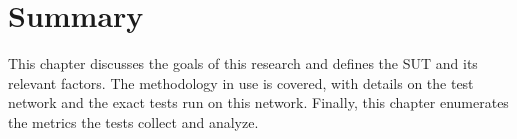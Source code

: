 \section{Summary}
\label{sec:method_summary}
\par This chapter discusses the goals of this research and defines the \ac{SUT} and its relevant factors. The methodology in use is covered, with details on the test network and the exact tests run on this network. Finally, this chapter enumerates the metrics the tests collect and analyze. 

